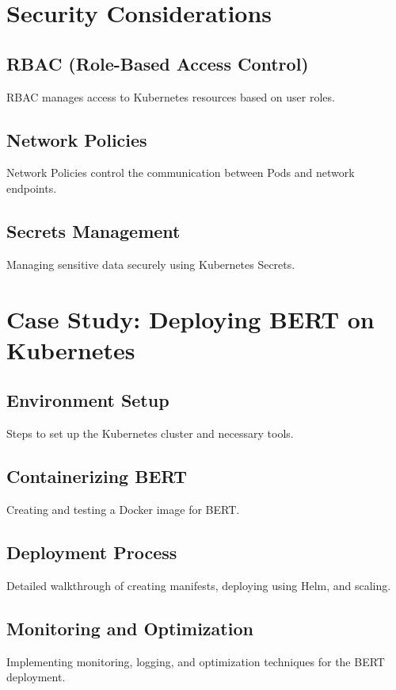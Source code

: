 \section{Security Considerations}

\subsection{RBAC (Role-Based Access Control)}
RBAC manages access to Kubernetes resources based on user roles.

\subsection{Network Policies}
Network Policies control the communication between Pods and network endpoints.

\subsection{Secrets Management}
Managing sensitive data securely using Kubernetes Secrets.

\section{Case Study: Deploying BERT on Kubernetes}

\subsection{Environment Setup}
Steps to set up the Kubernetes cluster and necessary tools.

\subsection{Containerizing BERT}
Creating and testing a Docker image for BERT.

\subsection{Deployment Process}
Detailed walkthrough of creating manifests, deploying using Helm, and scaling.

\subsection{Monitoring and Optimization}
Implementing monitoring, logging, and optimization techniques for the BERT deployment.

